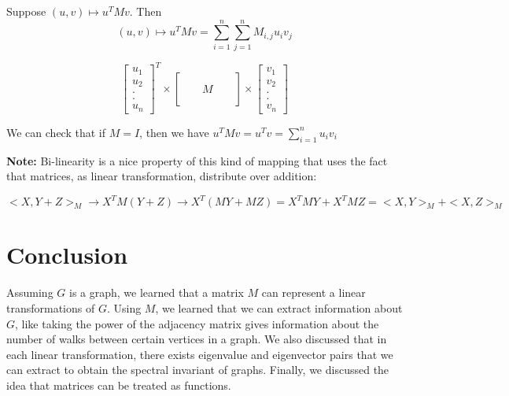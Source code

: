 \documentclass{article}
\begin{document}
Suppose $(u,v) \mapsto u^T M v$. Then $$(u,v) \mapsto u^T M v = \sum_{i=1}^{n} \sum_{j=1}^{n} M_{i,j} u_i v_j$$


$$ \left[ \begin{array}{ccccc}
u_1 \\
u_2 \\
. \\
.\\
u_n
\end{array} \right] ^T
\times  \left[ \begin{array}{ccccc}
 & & & & \\
 & & & & \\
  & & M& & \\
   & & & & \\
    & & & &
\end{array} \right]
%
\times
\left[ \begin{array}{ccccc}
v_1 \\
v_2\\ 
. \\
. \\
v_n
\end{array} \right]
$$

We can check that if $M = I$, then we have $u^T M v = u^T  v =  \sum_{i=1}^{n} u_i v_i$

\textbf{Note:} Bi-linearity is a nice property of this kind of mapping that uses the fact that matrices, as linear transformation, distribute over addition: 

$$<X,Y+Z>_M \rightarrow X^TM(Y+Z) \rightarrow X^T(MY+MZ) = X^TMY + X^TMZ = <X,Y>_M + <X,Z>_M$$

\section{Conclusion}
Assuming $G$ is a graph, we learned that a matrix $M$ can represent a linear transformations of $G$. Using $M$, we learned that we can extract information about $G$, like taking the power of the adjacency matrix gives information about the number of walks between certain vertices in a graph. We also discussed that in each linear transformation, there exists eigenvalue and eigenvector pairs that we can extract to obtain the spectral invariant of graphs. Finally, we discussed the idea that matrices can be treated as functions.
\end{document}
